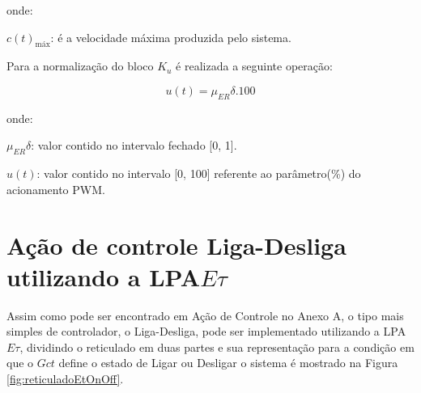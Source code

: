 \vspace{-0.4cm}
onde:

$c(t)_{\text{máx}}$: é a velocidade máxima produzida pelo sistema.


Para a normalização do bloco $K_u$ é realizada a seguinte operação:

\begin{equation}
u(t) = \mu_{ER}\delta . 100
\end{equation}

\vspace{-0.4cm}
onde:

$\mu_{ER}\delta$: valor contido no intervalo fechado [0, 1].

$u(t)$: valor contido no intervalo [0, 100] 
referente ao parâmetro(\%) do acionamento PWM.




\newpage


\section{Ação de controle Liga-Desliga utilizando a LPA$E\tau$}

Assim como pode ser encontrado em Ação de Controle no Anexo A, 
o tipo mais simples de controlador, o Liga-Desliga,
pode ser implementado utilizando a 
LPA$E\tau$, dividindo o reticulado em duas partes
e sua representação para a condição em que o $Gct$ define o estado
de Ligar ou Desligar o sistema é mostrado na 
Figura \ref{fig:reticuladoEtOnOff}.





